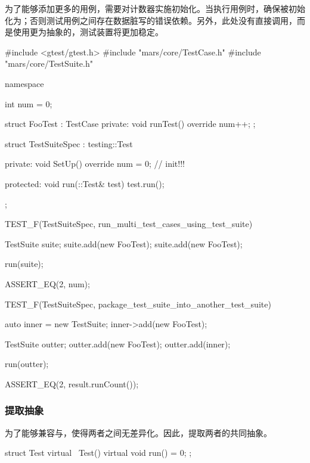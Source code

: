 \begin{content}
为了能够添加更多的用例，需要对计数器实施初始化。当执行用例时，确保被初始化为；否则测试用例之间存在数据脏写的错误依赖。另外，此处没有直接调用，而是使用更为抽象的，测试装置将更加稳定。

\begin{leftbar}
 \begin{c++}[caption={\ttfamily{test/mars/core/TestSuiteSpec.cc}}]
#include <gtest/gtest.h>
#include "mars/core/TestCase.h"
#include "mars/core/TestSuite.h"

namespace {
  int num = 0;

  struct FooTest : TestCase {
  private:
    void runTest() override {
      num++;
    }
  };

  struct TestSuiteSpec : testing::Test {
  private:
    void SetUp() override {
      num = 0;  // init!!!
    }

  protected:
    void run(::Test& test) {
      test.run();
    }
  };
}

TEST_F(TestSuiteSpec, run_multi_test_cases_using_test_suite) {
  TestSuite suite;
  suite.add(new FooTest);
  suite.add(new FooTest);

  run(suite);

  ASSERT_EQ(2, num);
}

TEST_F(TestSuiteSpec, package_test_suite_into_another_test_suite) {
  auto inner = new TestSuite;
  inner->add(new FooTest);

  TestSuite outter;
  outter.add(new FooTest);
  outter.add(inner);

  run(outter);

  ASSERT_EQ(2, result.runCount());
}
 \end{c++}
\end{leftbar}

\subsubsection{提取抽象}

为了能够兼容与，使得两者之间无差异化。因此，提取两者的共同抽象。

\begin{leftbar}
 \begin{c++}[caption={\ttfamily{include/mars/core/Test.h}}]
struct Test {
  virtual ~Test() {}
  virtual void run() = 0;
};
 \end{c++}
\end{leftbar}


\end{content}
